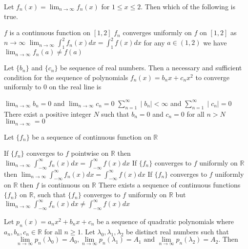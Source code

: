 \documentclass[10pt]{exam}
\newcommand{\R}{\ensuremath{\mathbb{R}}}
\begin{document}
\begin{questions}
\smallskip Let $f_n(x)=\lim_{n \rightarrow \infty} f_n(x)$ for $1 \leq x \leq 2$. Then which of the following is true.

\begin{choices}
\choice $f$ is a continuous function on $[1,2]$
\choice $f_n$ converges uniformly on $f$ on $[1,2]$ as $n \rightarrow \infty$ 
\choice $\lim_{n\rightarrow \infty} \int_1^2 f_n(x) dx =\int_1^2 f(x) dx$
\choice for any $a\in (1,2)$ we have $\lim_{n\rightarrow \infty} f_n(a) \neq f(a)$
\end{choices}

\question
Let $\{b_n\}$ and $\{c_n\}$ be sequence of real numbers. Then a necessary and sufficient condition for the sequence of polynomials $f_n(x) = b_nx + c_nx^2$ to converge uniformly to $0$ on the real line is 

\begin{choices}
\choice $\lim_{n \rightarrow \infty} b_n = 0$ and $\lim_{n\rightarrow \infty} c_n = 0$ 
\choice $\sum_{n = 1}^{\infty}\mid b_n \mid < \infty$ and $\sum_{n = 1}^{\infty} \mid c_n \mid = 0$
\choice There exist a positive integer $N$ such that $b_n = 0$ and $c_n = 0$ for all $n > N$
\choice $\lim_{n\rightarrow \infty} = 0$
\end{choices}

\question 
Let $\{f_n\}$ be a sequence of continuous function on $\R$

\begin{checkboxes}
\choice If $\{f_n\}$ converges to $f$ pointwise on $\R$ then $ \lim_{n\rightarrow \infty} \int_{-\infty}^{\infty} f_n(x) dx = \int_{-\infty}^{\infty} f(x) dx $
\choice If $\{f_n\}$ converges to $f$ uniformly on $\R$ then $ \lim_{n\rightarrow \infty} \int_{-\infty}^{\infty} f_n(x) dx = \int_{-\infty}^{\infty} f(x) dx $
\choice If $\{f_n\}$ converges to $f$ uniformly on $\R$ then $f$ is continuous on $\R$ 
\choice There exists a sequence of continuous functions  $\{f_n\}$ on $\R$, such that $\{f_n\}$ converges to  $f$ uniformly  on $\R$ but $ \lim_{n\rightarrow \infty} \int_{-\infty}^{\infty} f_n(x) dx \neq  \int_{-\infty}^{\infty} f(x) dx $
\end{checkboxes}

\question 
Let $p_n(x) = a_n x^2 + b_n x + c_n$ be a sequence of quadratic polynomials where $a_n, b_n, c_n \in \R$ for all $n \geq 1$. Let $\lambda_0, \lambda_1, \lambda_2$ be distinct real numbers such that 
$$ \lim_{n\rightarrow \infty} p_n(\lambda_0) = A_0,  \lim_{n\rightarrow \infty} p_n(\lambda_1) = A_1 \text{ and }  \lim_{n\rightarrow \infty} p_n(\lambda_2) = A_2. \text{ Then}$$


\end{questions}
\end{document}
